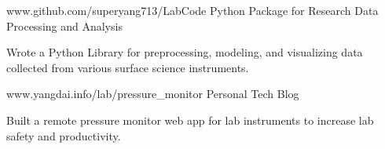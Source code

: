 


\begin{cventries}


\cventry
{www.github.com/superyang713/LabCode}
{Python Package for Research Data Processing and Analysis}
{}
{}
{
\begin{cvitems}
\item {Wrote a Python Library for preprocessing, modeling, and visualizing data
    collected from various surface science instruments.}
\end{cvitems}
}


\cventry
{www.yangdai.info/lab/pressure\_monitor}
{Personal Tech Blog}
{}
{}
{
\begin{cvitems}
\item {Built a remote pressure monitor web app for lab instruments to increase
    lab safety and productivity.}
\end{cvitems}
}


\end{cventries}


